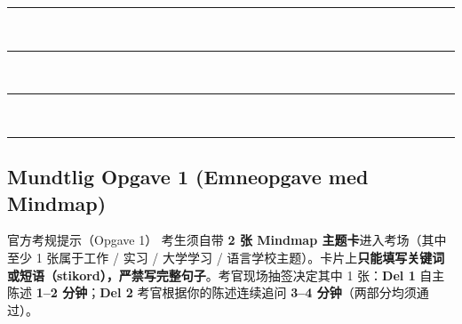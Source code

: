 \begin{tcolorbox}[enhanced, unbreakable, colback=white, colframe=NCDTeal, coltitle=white, fonttitle=\bfseries, title={Dit svar — Til: Kundeservice \quad | \quad Emne: Manglende levering -- ordrenummer 33918}, arc=2pt, boxrule=0.8pt, left=10pt, right=10pt, top=5pt, bottom=5pt]
\rule{\linewidth}{0.4pt}\\[0.38em]
\rule{\linewidth}{0.4pt}\\[0.38em]
\rule{\linewidth}{0.4pt}\\[0.38em]
\rule{\linewidth}{0.4pt}
\end{tcolorbox}

\clearpage
{}

\subsection*{Mundtlig Opgave 1 (Emneopgave med Mindmap)}

\begin{tipbox}{官方考规提示（Opgave 1）}
\small
考生须自带 \textbf{2 张 Mindmap 主题卡}进入考场（其中至少 1 张属于工作 / 实习 / 大学学习 / 语言学校主题）。卡片上\textbf{只能填写关键词或短语（stikord），严禁写完整句子}。考官现场抽签决定其中 1 张：\textbf{Del 1} 自主陈述 \textbf{1--2 分钟}；\textbf{Del 2} 考官根据你的陈述连续追问 \textbf{3--4 分钟}（两部分均须通过）。
\end{tipbox}

